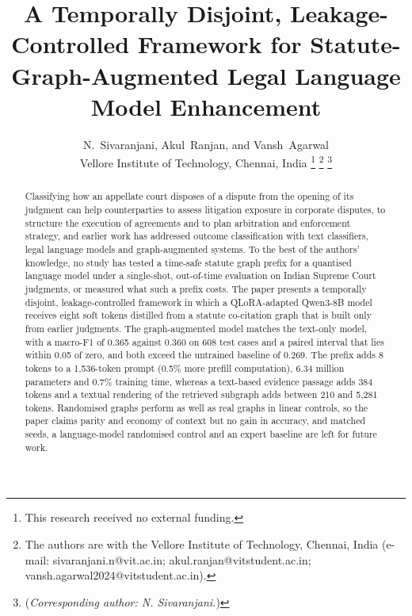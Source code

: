 \documentclass[journal]{IEEEtran}
\begin{document}
\title{A Temporally Disjoint, Leakage-Controlled Framework for Statute-Graph-Augmented Legal Language Model Enhancement}

\author{N.~Sivaranjani, Akul~Ranjan, and Vansh~Agarwal\\
Vellore Institute of Technology, Chennai, India
\thanks{This research received no external funding.}
\thanks{The authors are with the Vellore Institute of Technology, Chennai, India (e-mail: sivaranjani.n@vit.ac.in; akul.ranjan@vitstudent.ac.in; vansh.agarwal2024@vitstudent.ac.in).}
\thanks{(\emph{Corresponding author: N. Sivaranjani.})}}


\maketitle

\begin{abstract}
Classifying how an appellate court disposes of a dispute from the opening of its judgment can help counterparties to assess litigation exposure in corporate disputes, to structure the execution of agreements and to plan arbitration and enforcement strategy, and earlier work has addressed outcome classification with text classifiers, legal language models and graph-augmented systems. To the best of the authors' knowledge, no study has tested a time-safe statute graph prefix for a quantised language model under a single-shot, out-of-time evaluation on Indian Supreme Court judgments, or measured what such a prefix costs. The paper presents a temporally disjoint, leakage-controlled framework in which a QLoRA-adapted Qwen3-8B model receives eight soft tokens distilled from a statute co-citation graph that is built only from earlier judgments. The graph-augmented model matches the text-only model, with a macro-F1 of 0.365 against 0.360 on 608 test cases and a paired interval that lies within 0.05 of zero, and both exceed the untrained baseline of 0.269. The prefix adds 8 tokens to a 1,536-token prompt (0.5\% more prefill computation), 6.34 million parameters and 0.7\% training time, whereas a text-based evidence passage adds 384 tokens and a textual rendering of the retrieved subgraph adds between 210 and 5,281 tokens. Randomised graphs perform as well as real graphs in linear controls, so the paper claims parity and economy of context but no gain in accuracy, and matched seeds, a language-model randomised control and an expert baseline are left for future work.
\end{abstract}
\end{document}
